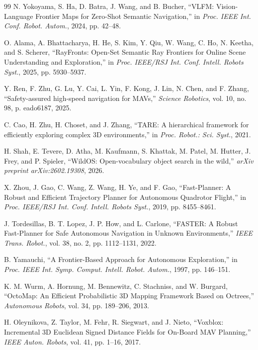 \documentclass[letterpaper,10pt,conference]{ieeeconf}
\begin{document}
{\begin{thebibliography}{99}
N. Yokoyama, S. Ha, D. Batra, J. Wang, and B. Bucher,
``VLFM: Vision-Language Frontier Maps for Zero-Shot Semantic Navigation,''
in \emph{Proc. IEEE Int. Conf. Robot. Autom.}, 2024, pp. 42--48.

O. Alama, A. Bhattacharya, H. He, S. Kim, Y. Qiu, W. Wang, C. Ho, N. Keetha, and S. Scherer,
``RayFronts: Open-Set Semantic Ray Frontiers for Online Scene Understanding and Exploration,''
in \emph{Proc. IEEE/RSJ Int. Conf. Intell. Robots Syst.}, 2025, pp. 5930--5937.

Y. Ren, F. Zhu, G. Lu, Y. Cai, L. Yin, F. Kong, J. Lin, N. Chen, and F. Zhang,
``Safety-assured high-speed navigation for MAVs,''
\emph{Science Robotics}, vol. 10, no. 98, p. eado6187, 2025.

C. Cao, H. Zhu, H. Choset, and J. Zhang,
``TARE: A hierarchical framework for efficiently exploring complex 3D environments,''
in \emph{Proc. Robot.: Sci. Syst.}, 2021.

H. Shah, E. Tevere, D. Atha, M. Kaufmann, S. Khattak, M. Patel, M. Hutter, J. Frey, and P. Spieler,
``WildOS: Open-vocabulary object search in the wild,''
\emph{arXiv preprint arXiv:2602.19308}, 2026.

X. Zhou, J. Gao, C. Wang, Z. Wang, H. Ye, and F. Gao,
``Fast-Planner: A Robust and Efficient Trajectory Planner for Autonomous
Quadrotor Flight,'' in \emph{Proc. IEEE/RSJ Int. Conf. Intell. Robots Syst.},
2019, pp. 8455--8461.

J. Tordesillas, B. T. Lopez, J. P. How, and L. Carlone,
``FASTER: A Robust Fast-Planner for Safe Autonomous Navigation in Unknown
Environments,'' \emph{IEEE Trans. Robot.}, vol. 38, no. 2, pp. 1112--1131,
2022.

B. Yamauchi,
``A Frontier-Based Approach for Autonomous Exploration,'' in \emph{Proc.
IEEE Int. Symp. Comput. Intell. Robot. Autom.}, 1997, pp. 146--151.

K. M. Wurm, A. Hornung, M. Bennewitz, C. Stachniss, and W. Burgard,
``OctoMap: An Efficient Probabilistic 3D Mapping Framework Based on Octrees,''
\emph{Autonomous Robots}, vol. 34, pp. 189--206, 2013.

H. Oleynikova, Z. Taylor, M. Fehr, R. Siegwart, and J. Nieto,
``Voxblox: Incremental 3D Euclidean Signed Distance Fields for On-Board MAV
Planning,'' \emph{IEEE Auton. Robots}, vol. 41, pp. 1--16, 2017.


\end{thebibliography}}
\end{document}
